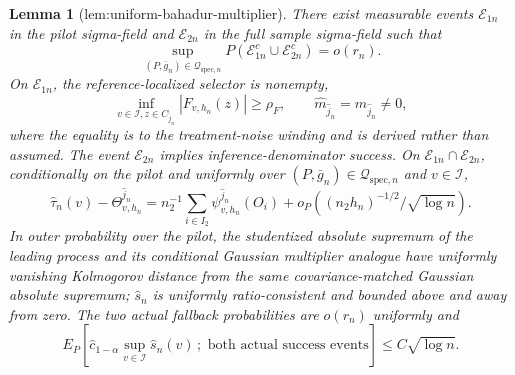 \documentclass{article}
\newtheorem{lemma}{Lemma}
\begin{document}
\begin{lemma}[lem:uniform-bahadur-multiplier]\label{lem:uniform-bahadur-multiplier}
There exist measurable events \(\mathcal E_{1n}\) in the pilot sigma-field and \(\mathcal E_{2n}\) in the full sample sigma-field such that
\[
 \sup_{(P,\bar g_n)\in\mathcal Q_{\mathrm{spec},n}}
 P(\mathcal E_{1n}^c\cup\mathcal E_{2n}^c)=o(r_n).
\]
On \(\mathcal E_{1n}\), the reference-localized selector is nonempty,
\[
 \inf_{v\in\mathcal I,z\in C_{\widehat j_n}}|F_{v,h_n}(z)|\ge\rho_F,
 \qquad
 \widehat m_{\widehat j_n}=m_{\widehat j_n}\ne0,
\]
where the equality is to the treatment-noise winding and is derived rather than assumed. The event \(\mathcal E_{2n}\) implies inference-denominator success. On \(\mathcal E_{1n}\cap\mathcal E_{2n}\), conditionally on the pilot and uniformly over \((P,\bar g_n)\in\mathcal Q_{\mathrm{spec},n}\) and \(v\in\mathcal I\),
\[
 \widehat\tau_n(v)-\Theta^{\widehat j_n}_{v,h_n}
 =n_2^{-1}\sum_{i\in I_2}\psi^{\widehat j_n}_{v,h_n}(O_i)
 +o_P\!\left((n_2h_n)^{-1/2}/\sqrt{\log n}\right).
\]
In outer probability over the pilot, the studentized absolute supremum of the leading process and its conditional Gaussian multiplier analogue have uniformly vanishing Kolmogorov distance from the same covariance-matched Gaussian absolute supremum; \(\widehat s_n\) is uniformly ratio-consistent and bounded above and away from zero. The two actual fallback probabilities are \(o(r_n)\) uniformly and
\[
 E_P\!\left[\widehat c_{1-\alpha}\sup_{v\in\mathcal I}\widehat s_n(v)\,;\text{ both actual success events}\right]\le C\sqrt{\log n}.
\]
\end{lemma}
\end{document}
